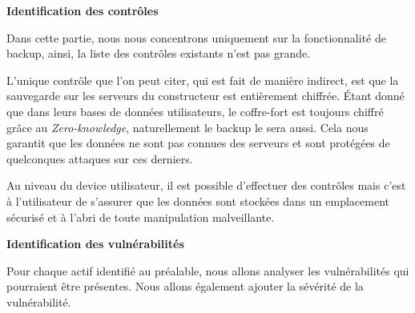 \textbf{Identification des contrôles}

Dans cette partie, nous nous concentrons uniquement sur la fonctionnalité de backup, ainsi, la liste des contrôles existants n'est pas grande. 

L'unique contrôle que l'on peut citer, qui est fait de manière indirect, est que la sauvegarde sur les serveurs du constructeur est entièrement chiffrée. Étant donné que dans leurs bases de données utilisateurs, le coffre-fort est toujours chiffré grâce au \textit{Zero-knowledge}, naturellement le backup le sera aussi. Cela nous garantit que les données ne sont pas connues des serveurs et sont protégées de quelconques attaques sur ces derniers.

Au niveau du device utilisateur, il est possible d'effectuer des contrôles mais c'est à l'utilisateur de s'assurer que les données sont stockées dans un emplacement sécurisé et à l'abri de toute manipulation malveillante.

\textbf{Identification des vulnérabilités}

Pour chaque actif identifié au préalable, nous allons analyser les vulnérabilités qui pourraient être présentes. Nous allons également ajouter la sévérité de la vulnérabilité. 

